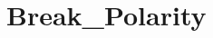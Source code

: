 \hypertarget{group___break___polarity}{\section{Break\-\_\-\-Polarity}
\label{group___break___polarity}
}
